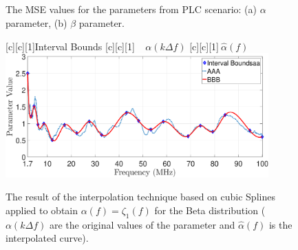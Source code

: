 \begin{figure}[h!]
	\centering
	\\~\\
	\\~\\
	\caption{The MSE values for the parameters from PLC scenario: (a) $\alpha$ parameter, (b) $\beta$ parameter.}
	\label{fig:boundsPLC}
\end{figure}
  
\begin{figure}[h]
	\centering
	[c][1]{Interval Bounds}
	[c][1]{$~~~~~{\alpha}(k \Delta f)$}
	[c][1]{$~\hat{\alpha}(f)$}
	\includegraphics[width=0.9\textwidth]{images/Alfa_fit_17.eps}
	\caption{The result of the interpolation technique based on cubic Splines applied to obtain $\alpha(f)=\zeta_1(f)$ for the Beta distribution (${\alpha}(k \Delta f)$ are the original values of the parameter and $\hat{\alpha}(f)$ is the interpolated curve).}
	\label{Fit_alfa}
\end{figure}

